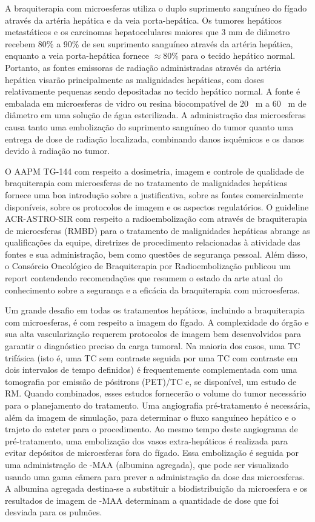 \documentclass[11pt,a4paper]{article}
\begin{document}
    A braquiterapia com microesferas utiliza o duplo suprimento sanguíneo do fígado através da artéria hepática e da veia porta-hepática. Os tumores hepáticos metastáticos e os carcinomas hepatocelulares maiores que 3 mm de diâmetro recebem 80\% a 90\% de seu suprimento sanguíneo através da artéria hepática, enquanto a veia porta-hepática fornece $\approx$80\% para o tecido hepático normal. Portanto, as fontes emissoras de radiação administradas através da artéria hepática visarão principalmente as malignidades hepáticas, com doses relativamente pequenas sendo depositadas no tecido hepático normal. A fonte  é embalada em microesferas de vidro ou resina biocompatível de 20 \unit{\mu m} a 60 \unit{\mu m} de diâmetro em uma solução de água esterilizada. A administração das microesferas causa tanto uma embolização do suprimento sanguíneo do tumor quanto uma entrega de dose de radiação localizada, combinando danos isquêmicos e os danos devido à radiação no tumor.

    O AAPM TG-144 com respeito a dosimetria, imagem e controle de qualidade de braquiterapia com microesferas de  no tratamento de malignidades hepáticas fornece uma boa introdução sobre a justificativa, sobre as fontes comercialmente disponíveis, sobre os protocolos de imagem e os aspectos regulatórios. O guideline ACR-ASTRO-SIR com respeito a radioembolização com através de braquiterapia de microesferas (RMBD) para o tratamento de malignidades hepáticas abrange as qualificações da equipe, diretrizes de procedimento relacionadas à atividade das fontes e sua administração, bem como questões de segurança pessoal. Além disso, o Consórcio Oncológico de Braquiterapia por Radioembolização publicou um report contendendo recomendações que resumem o estado da arte atual do conhecimento sobre a segurança e a eficácia da braquiterapia com microesferas.

    Um grande desafio em todas os tratamentos hepáticos, incluindo a braquiterapia com microesferas, é com respeito a imagem do fígado. A complexidade do órgão e sua alta vascularização requerem protocolos de imagem bem desenvolvidos para garantir o diagnóstico preciso da carga tumoral. Na maioria dos casos, uma TC trifásica (isto é, uma TC sem contraste seguida por uma TC com contraste em dois intervalos de tempo definidos) é frequentemente complementada com uma tomografia por emissão de pósitrons (PET)/TC e, se disponível, um estudo de RM. Quando combinados, esses estudos fornecerão o volume do tumor necessário para o planejamento do tratamento. Uma angiografia pré-tratamento é necessária, além da imagem de simulação, para determinar o fluxo sanguíneo hepático e o trajeto do cateter para o procedimento. Ao mesmo tempo deste angiograma de pré-tratamento, uma embolização dos vasos extra-hepáticos é realizada para evitar depósitos de microesferas fora do fígado. Essa embolização é seguida por uma administração de -MAA (albumina agregada), que pode ser visualizado usando uma gama câmera para prever a administração da dose das microesferas. A albumina agregada destina-se a substituir a biodistribuição da microesfera e os resultados de imagem de -MAA determinam a quantidade de dose que foi desviada para os pulmões.
\end{document}
